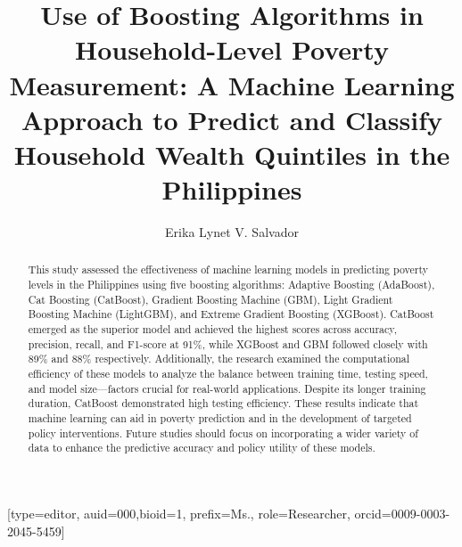 \documentclass[a4paper,fleqn]{cas-sc}
\begin{document}
\let\WriteBookmarks\relax
\def\floatpagepagefraction{1}
\def\textpagefraction{.001}

\title [mode = title]{Use of Boosting Algorithms in Household-Level Poverty Measurement: A Machine Learning Approach to Predict and Classify Household Wealth Quintiles in the Philippines
}                      

\author[1,2]{Erika Lynet V. Salvador}[type=editor,
                        auid=000,bioid=1,
                        prefix=Ms.,
                        role=Researcher,
                        orcid=0009-0003-2045-5459]
\cormark[1]
\fnmark[1]





\begin{abstract}
This study assessed the effectiveness of machine learning models in predicting poverty levels in the Philippines using five boosting algorithms: Adaptive Boosting (AdaBoost), Cat Boosting (CatBoost), Gradient Boosting Machine (GBM), Light Gradient Boosting Machine (LightGBM), and Extreme Gradient Boosting (XGBoost). CatBoost emerged as the superior model and achieved the highest scores across accuracy, precision, recall, and F1-score at 91\%, while XGBoost and GBM followed closely with 89\% and 88\% respectively. Additionally, the research examined the computational efficiency of these models to analyze the balance between training time, testing speed, and model size—factors crucial for real-world applications. Despite its longer training duration, CatBoost demonstrated high testing efficiency. These results indicate that machine learning can aid in poverty prediction and in the development of targeted policy interventions. Future studies should focus on incorporating a wider variety of data to enhance the predictive accuracy and policy utility of these models.
\end{abstract}
\end{document}

